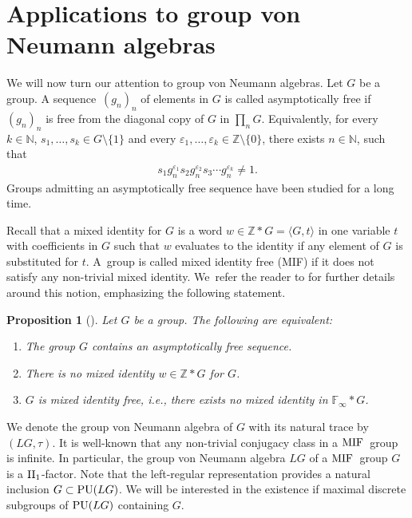 \documentclass[pdftex]{sigma}
\numberwithin{equation}{section}
\newtheorem{Proposition}[Theorem]{Proposition}
 { \theoremstyle{definition}
\newtheorem{Definition}[Theorem]{Definition}
\newtheorem{Note}[Theorem]{Note}
\newtheorem{Example}[Theorem]{Example}
\newtheorem{Remark}[Theorem]{Remark}
\newtheorem{Question}[Theorem]{Question} }
\begin{document}
\section{Applications to group von Neumann algebras}

We will now turn our attention to group von Neumann algebras. Let $G$ be a group. A sequ\-ence~$(g_n)_n$ of elements in $G$ is called asymptotically free if $(g_n)_n$ is free from the diagonal copy of $G$ in $\prod_n G$. Equivalently, for every $k \in \mathbb N$, $s_1,\dots,s_k \in G \setminus \{1\}$ and every $\varepsilon_1,\dots,\varepsilon_k \in \mathbb Z \setminus \{0\}$, there exists $n \in \mathbb N$, such that
\begin{gather*}
s_1 g_n^{\varepsilon_1} s_2 g_n^{\varepsilon_2} s_3 \cdots g_n^{\varepsilon_k} \neq 1.
\end{gather*}
Groups admitting an asymptotically free sequence have been studied for a long time.

Recall that a mixed identity for $G$ is a word $w \in \mathbb Z \ast G = \langle G, t\rangle$ in one variable $t$ with coefficients in $G$ such that $w$ evaluates to the identity if any element of $G$ is substituted for $t$. A~group is called mixed identity free (MIF) if it does not satisfy any non-trivial mixed identity. We~refer the reader to \cite{MR3556970} for further details around this notion, emphasizing the following statement.

\begin{Proposition}[{\cite[proof of Proposition 5.3 and Remark 5.1]{MR3556970}}]
Let $G$ be a group. The following are equivalent:
\begin{enumerate}\itemsep=0pt
\item[$1.$] The group $G$ contains an asymptotically free sequence.
\item[$2.$] There is no mixed identity $w \in \mathbb Z \ast G$ for $G$.
\item[$3.$] $G$ is mixed identity free, i.e., there exists no mixed identity in $\mathbb F_\infty \ast G$.
\end{enumerate}
\end{Proposition}

We denote the group von Neumann algebra of $G$ with its natural trace by $(LG,\tau)$. It is well-known that any non-trivial conjugacy class in a ${\rm MIF}$~group is infinite. In particular, the group von Neumann algebra $LG$ of a ${\rm MIF}$~group $G$ is a ${\rm II}_1$-factor. Note that the left-regular representation provides a natural inclusion $G \subset {\rm PU}(LG)$.
 We will be interested in the existence if maximal discrete subgroups of ${\rm PU}(LG)$ containing $G$.
\end{document}
